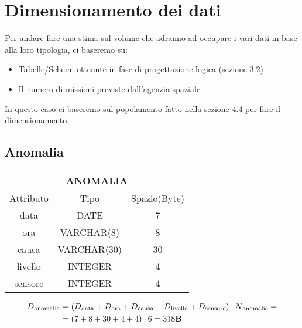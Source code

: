 \section{Dimensionamento dei dati}
Per andare fare una stima sul volume che adranno ad occupare i vari
dati in base alla loro tipologia, ci baseremo su:
\begin{itemize}
\item Tabelle/Schemi ottenute in fase di progettazione logica (sezione
  3.2)
\item Il numero di missioni previste dall'agenzia spaziale
\end{itemize}
In questo caso ci baseremo sul popolamento fatto nella sezione 4.4 per
fare il dimensionamento.
\subsection{Anomalia}
\begin{tabular}{|c|c|c|}
  \hline
  \multicolumn{3}{|c|}{\textbf{ANOMALIA}}\\
  \hline
  Attributo & Tipo & Spazio(Byte) \\
  \hline
  data & DATE & 7 \\
  ora & VARCHAR(8)  & 8 \\
  causa & VARCHAR(30) & 30 \\
  livello & INTEGER & 4 \\
  sensore & INTEGER & 4 \\
  \hline
\end{tabular}
\begin{equation}
  \begin{aligned}
    D{\text{\textsubscript{anomalia}}}&=(D{\text{\textsubscript{data}}} + D{\text{\textsubscript{ora}}} +D{\text{\textsubscript{causa}}} +D{\text{\textsubscript{livello}}} + D{\text{\textsubscript{sensore}}}) \cdot N{\text{\textsubscript{anomalie}}}=\\
    &=(7+8+30+4+4)\cdot 6 = 318\text{\textbf{B}}\\
  \end{aligned}
\end{equation}
